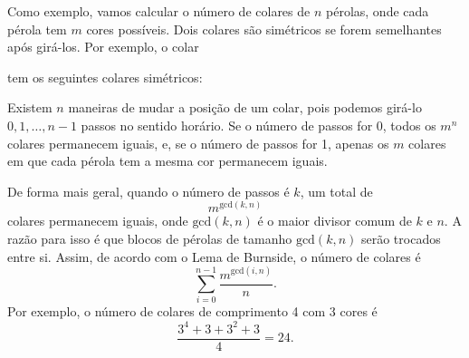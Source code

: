 Como exemplo, vamos calcular o número de
colares de $n$ pérolas,
onde cada pérola tem $m$ cores possíveis.
Dois colares são simétricos se forem
semelhantes após girá-los.
Por exemplo, o colar
\begin{center}
\end{center}
tem os seguintes colares simétricos:
\begin{center}
\end{center}
Existem $n$ maneiras de mudar a posição
de um colar,
pois podemos girá-lo
$0,1,\ldots,n-1$ passos no sentido horário.
Se o número de passos for 0,
todos os $m^n$ colares permanecem iguais,
e, se o número de passos for 1,
apenas os $m$ colares em que cada
pérola tem a mesma cor permanecem iguais.

De forma mais geral, quando o número de passos é $k$,
um total de
\[m^{\textrm{gcd}(k,n)}\]
colares permanecem iguais,
onde $\textrm{gcd}(k,n)$ é o maior divisor comum
de $k$ e $n$.
A razão para isso é que blocos
de pérolas de tamanho $\textrm{gcd}(k,n)$
serão trocados entre si.
Assim, de acordo com o Lema de Burnside,
o número de colares é
\[\sum_{i=0}^{n-1} \frac{m^{\textrm{gcd}(i,n)}}{n}. \]
Por exemplo, o número de colares de comprimento 4
com 3 cores é
\[\frac{3^4+3+3^2+3}{4} = 24. \]

